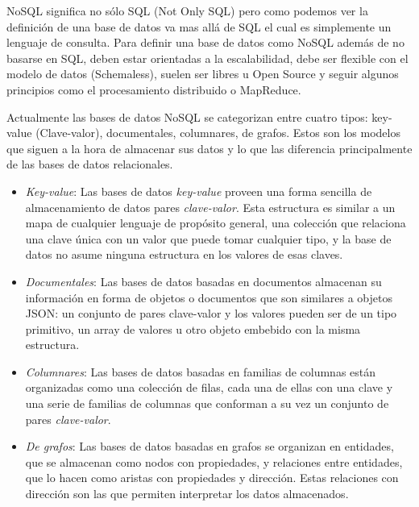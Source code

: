 NoSQL significa no sólo SQL (Not Only SQL) pero como podemos ver la definición de una base de datos va mas allá de SQL el cual es simplemente un lenguaje de consulta. Para definir una base de datos como NoSQL además de no basarse en SQL, deben estar orientadas a la escalabilidad, debe ser flexible con el modelo de datos (Schemaless), suelen ser libres u Open Source y seguir algunos principios como el procesamiento distribuido o MapReduce.

Actualmente las bases de datos NoSQL se categorizan entre cuatro tipos: key-value (Clave-valor), documentales, columnares, de grafos. Estos son los modelos que siguen a la hora de almacenar sus datos y lo que las diferencia principalmente de las bases de datos relacionales.

\begin{itemize}
  \item \emph{Key-value}: Las bases de datos \emph{key-value} proveen una forma sencilla de almacenamiento de datos pares \emph{clave-valor}. Esta estructura es similar a un mapa de cualquier lenguaje de propósito general, una colección que relaciona una clave única con un valor que puede tomar cualquier tipo, y la base de datos no asume ninguna estructura en los valores de esas claves.

  \item \emph{Documentales}: Las bases de datos basadas en documentos almacenan su información en forma de objetos o documentos que son similares a objetos JSON\cite{json}: un conjunto de pares clave-valor y los valores pueden ser de un tipo primitivo, un array de valores u otro objeto embebido con la misma estructura.

  \item \emph{Columnares}: Las bases de datos basadas en familias de columnas están organizadas como una colección de filas, cada una de ellas con una clave y una serie de familias de columnas que conforman a su vez un conjunto de pares \emph{clave-valor}.

  \item \emph{De grafos}: Las bases de datos basadas en grafos se organizan en entidades, que se almacenan como nodos con propiedades, y relaciones entre entidades, que lo hacen como aristas con propiedades y dirección. Estas relaciones con dirección son las que permiten interpretar los datos almacenados.
\end{itemize}

